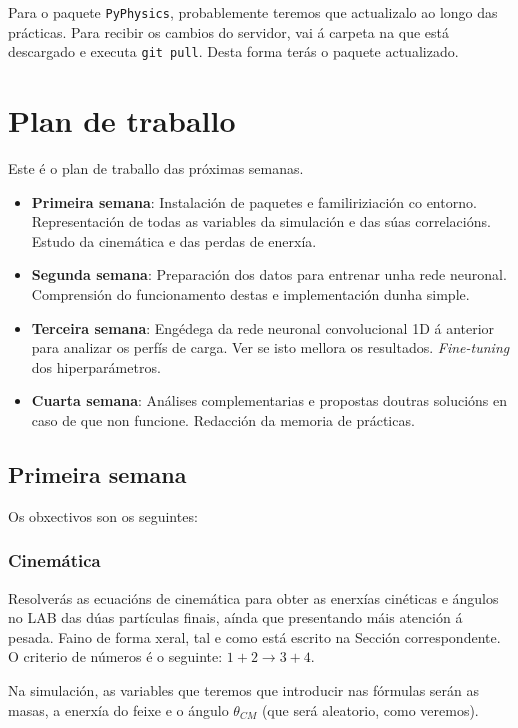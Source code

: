 \documentclass[11pt, a4paper]{article}
\begin{document}
Para o paquete \texttt{PyPhysics}, probablemente teremos que actualizalo ao longo das prácticas. Para recibir os cambios do servidor, vai á carpeta na que está descargado e executa \verb|git pull|. Desta forma terás o paquete actualizado.


\section{Plan de traballo}
Este é o plan de traballo das próximas semanas.

\begin{itemize}
    \item \textbf{Primeira semana}: Instalación de paquetes e familiriziación co entorno. Representación de todas as variables da simulación e das súas correlacións. Estudo da cinemática e das perdas de enerxía.
    \item \textbf{Segunda semana}: Preparación dos datos para entrenar unha rede neuronal. Comprensión do funcionamento destas e implementación dunha simple.
    \item \textbf{Terceira semana}: Engédega da rede neuronal convolucional 1D á anterior para analizar os perfís de carga. Ver se isto mellora os resultados. \textit{Fine-tuning} dos hiperparámetros.
    \item \textbf{Cuarta semana}: Análises complementarias e propostas doutras solucións en caso de que non funcione. Redacción da memoria de prácticas.
\end{itemize}

\subsection{Primeira semana}
Os obxectivos son os seguintes:

\subsubsection*{Cinemática}
Resolverás as ecuacións de cinemática para obter as enerxías cinéticas e ángulos no LAB das dúas partículas finais, aínda que presentando máis atención á pesada. Faino de forma xeral, tal e como está escrito na Sección correspondente. O criterio de números é o seguinte: $1 + 2 \longrightarrow 3 + 4$.

Na simulación, as variables que teremos que introducir nas fórmulas serán as masas, a enerxía do feixe e o ángulo $\theta_{CM}$ (que será aleatorio, como veremos).
\end{document}
